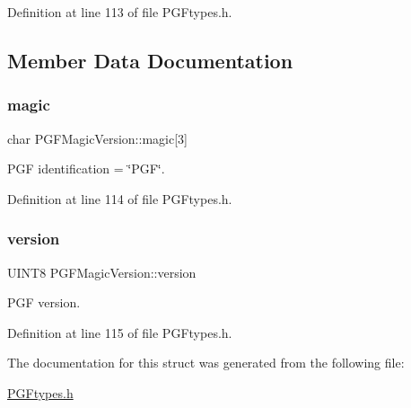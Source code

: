 Definition at line 113 of file P\+G\+Ftypes.\+h.



\subsection{Member Data Documentation}
\mbox{\label{structPGFMagicVersion_a8b27eabb723f35b4fdb9e357e69b334b}} 
\subsubsection{\texorpdfstring{magic}{magic}}
{\footnotesize\ttfamily char P\+G\+F\+Magic\+Version\+::magic\mbox{[}3\mbox{]}}



P\+GF identification = \char`\"{}\+P\+G\+F\char`\"{}. 



Definition at line 114 of file P\+G\+Ftypes.\+h.

\mbox{\label{structPGFMagicVersion_aa7ff5e50537cac9dd4c62d4c8982d09d}} 
\subsubsection{\texorpdfstring{version}{version}}
{\footnotesize\ttfamily U\+I\+N\+T8 P\+G\+F\+Magic\+Version\+::version}



P\+GF version. 



Definition at line 115 of file P\+G\+Ftypes.\+h.



The documentation for this struct was generated from the following file\+:\begin{DoxyCompactItemize}
\item 
\mbox{\hyperlink{PGFtypes_8h}{P\+G\+Ftypes.\+h}}\end{DoxyCompactItemize}
